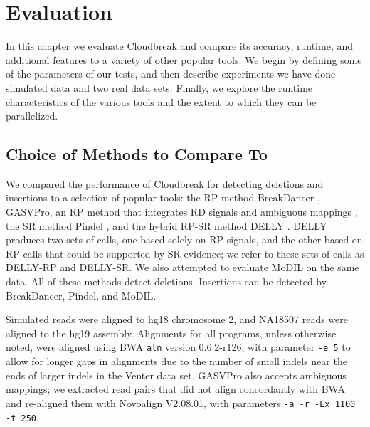 \chapter{Evaluation}\label{chap_cloudbreak_eval}

In this chapter we evaluate Cloudbreak and compare its accuracy, runtime, and additional features to a variety of other popular tools. We begin by defining some of the parameters of our tests, and then describe experiments we have done simulated data and two real data sets. Finally, we explore the runtime characteristics of the various tools and the extent to which they can be parallelized.

\section{Choice of Methods to Compare To}

We compared the performance of Cloudbreak for detecting deletions and insertions to a selection of popular tools: the RP method BreakDancer \cite{Chen:2009p3}, GASVPro, an RP method that integrates RD signals and ambiguous mappings \cite{Sindi:2012kk}, the SR method Pindel \cite{Ye:2009p2}, and the hybrid RP-SR method DELLY \cite{Rausch:2012he}. DELLY produces two sets of calls, one based solely on RP signals, and the other based on RP calls that could be supported by SR evidence; we refer to these sets of calls as DELLY-RP and DELLY-SR. We also attempted to evaluate MoDIL on the same data. All of these methods detect deletions. Insertions can be detected by BreakDancer, Pindel, and MoDIL. 

Simulated reads were aligned to hg18 chromosome 2, and NA18507 reads were aligned to the hg19 assembly. Alignments for all programs, unless otherwise noted, were aligned using BWA \texttt{aln} version 0.6.2-r126, with parameter \texttt{-e 5} to allow for longer gaps in alignments due to the number of small indels near the ends of larger indels in the Venter data set. GASVPro also accepts ambiguous mappings; we extracted read pairs that did not align concordantly with BWA and re-aligned them with Novoalign V2.08.01, with parameters \texttt{-a -r -Ex 1100 -t 250}. 

